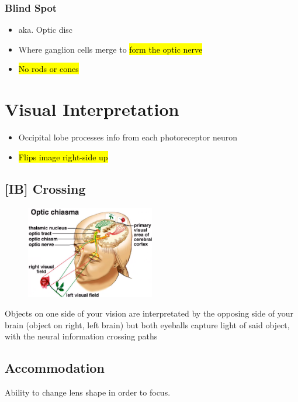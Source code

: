 \documentclass[a4paper,12pt]{article}
\begin{document}
\subsubsection{Blind Spot}
\begin{itemize}
    \item{aka. Optic disc}
    \item{Where ganglion cells merge to \hl{form the optic nerve}}
    \item{\hl{No rods or cones}}
\end{itemize}

\section{Visual Interpretation}
\begin{itemize}
    \item{Occipital lobe processes info from each photoreceptor neuron}
    \item{\hl{Flips image right-side up}}
\end{itemize}

\subsection{[IB] Crossing}

\begin{figure}[H]
    \centering
    \includegraphics[width=0.50\textwidth]{cross}
\end{figure}

Objects on one side of your vision are interpretated by the opposing side of your brain (object on right, left brain) but both eyeballs capture light of said object, with the neural information crossing paths

\subsection{Accommodation}
Ability to change lens shape in order to focus.
\end{document}
